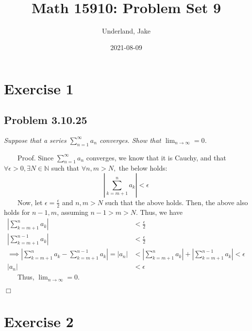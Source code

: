 \documentclass[
]{article}
\title{Math 15910: Problem Set 9}
\author{Underland, Jake}
\date{2021-08-09}
\begin{document}
\maketitle

{
\setcounter{tocdepth}{2}
\tableofcontents
}
\hypertarget{exercise-1}{%
\section{Exercise 1}\label{exercise-1}}

\hypertarget{problem-3.10.25}{%
\subsection{Problem 3.10.25}\label{problem-3.10.25}}

\textit{Suppose that a series $\sum ^ \infty _{n=1} a_n$ converges. Show that $\lim _{n\to \infty}=0$.}

~~~~Proof. Since \(\sum ^ \infty _{n=1} a_n\) converges, we know that it
is Cauchy, and that \(\forall \epsilon > 0, \exists N \in \mathbb{N}\)
such that \(\forall n, m > N,\) the below holds:
\[|\sum ^n _{k=m+1} a_k| < \epsilon \] ~~~~Now, let
\(\epsilon = \frac{\epsilon}{2}\) and \(n, m > N\) such that the above
holds. Then, the above also holds for \(n - 1, m\), assuming
\(n-1 > m > N\). Thus, we have \[\begin{aligned} 
|\sum ^n _{k=m+1} a_k| &<  \frac{\epsilon}{2} \\
|\sum ^{n-1} _{k=m+1} a_k| &<  \frac{\epsilon}{2} \\
\implies |\sum ^n _{k=m+1} a_k - \sum ^{n-1} _{k=m+1} a_k| = |a_n| &< |\sum ^n _{k=m+1} a_k|+|\sum ^{n-1} _{k=m+1} a_k|<\epsilon \\
|a_n| &<\epsilon
\end{aligned}\] ~~~~Thus, \(\lim _{n\to \infty}=0\).

\hfill \(\Box\)

\hypertarget{exercise-2}{%
\section{Exercise 2}\label{exercise-2}}
\end{document}

